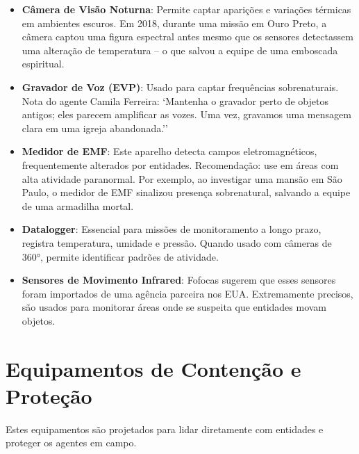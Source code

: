 \documentclass{book}
\begin{document}
\begin{itemize}
    \item \textbf{Câmera de Visão Noturna}: Permite captar aparições e variações térmicas em ambientes escuros. Em 2018, durante uma missão em Ouro Preto, a câmera captou uma figura espectral antes mesmo que os sensores detectassem uma alteração de temperatura – o que salvou a equipe de uma emboscada espiritual.

    \item \textbf{Gravador de Voz (EVP)}: Usado para captar frequências sobrenaturais. Nota do agente Camila Ferreira: `Mantenha o gravador perto de objetos antigos; eles parecem amplificar as vozes. Uma vez, gravamos uma mensagem clara em uma igreja abandonada.''

    \item \textbf{Medidor de EMF}: Este aparelho detecta campos eletromagnéticos, frequentemente alterados por entidades. Recomendação: use em áreas com alta atividade paranormal. Por exemplo, ao investigar uma mansão em São Paulo, o medidor de EMF sinalizou presença sobrenatural, salvando a equipe de uma armadilha mortal.

    \item \textbf{Datalogger}: Essencial para missões de monitoramento a longo prazo, registra temperatura, umidade e pressão. Quando usado com câmeras de 360°, permite identificar padrões de atividade.

    \item \textbf{Sensores de Movimento Infrared}: Fofocas sugerem que esses sensores foram importados de uma agência parceira nos EUA. Extremamente precisos, são usados para monitorar áreas onde se suspeita que entidades movam objetos.
\end{itemize}

\section{Equipamentos de Contenção e Proteção}
Estes equipamentos são projetados para lidar diretamente com entidades e proteger os agentes em campo.
\end{document}
